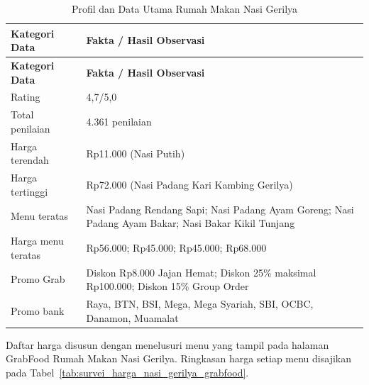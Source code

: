 \begingroup
\begin{xltabular}{\textwidth}{|Z{3.4cm}|Y|}
\caption{Profil dan Data Utama Rumah Makan Nasi Gerilya}
\label{tab:data_gerilya} \\
        \toprule
        \textbf{Kategori Data} & \textbf{Fakta / Hasil Observasi}                                                                             \\ \hline
        \midrule
        \endfirsthead
        \toprule
        \textbf{Kategori Data} & \textbf{Fakta / Hasil Observasi}                                                                             \\ \hline
        \midrule
\endhead
{}
\endfoot
        \bottomrule
        \endlastfoot
        Rating                 & 4,7/5,0                                                                                             \\ \hline
        Total penilaian        & 4.361 penilaian                                                                                     \\ \hline
        Harga terendah         & Rp11.000 (Nasi Putih)                                                                               \\ \hline
        Harga tertinggi        & Rp72.000 (Nasi Padang Kari Kambing Gerilya)                                                         \\ \hline
        Menu teratas           & Nasi Padang Rendang Sapi; Nasi Padang Ayam Goreng; Nasi Padang Ayam Bakar; Nasi Bakar Kikil Tunjang \\ \hline
        Harga menu teratas     & Rp56.000; Rp45.000; Rp45.000; Rp68.000                                                              \\ \hline
        Promo Grab             & Diskon Rp8.000 Jajan Hemat; Diskon 25\% maksimal Rp100.000; Diskon 15\% Group Order                 \\ \hline
        Promo bank             & Raya, BTN, BSI, Mega, Mega Syariah, SBI, OCBC, Danamon, Muamalat                                    \\ \hline
        \bottomrule
    
\end{xltabular}
\endgroup

Daftar harga disusun dengan menelusuri menu yang tampil pada halaman GrabFood Rumah Makan Nasi Gerilya. Ringkasan harga setiap menu disajikan pada Tabel~\ref{tab:survei_harga_nasi_gerilya_grabfood}. 

